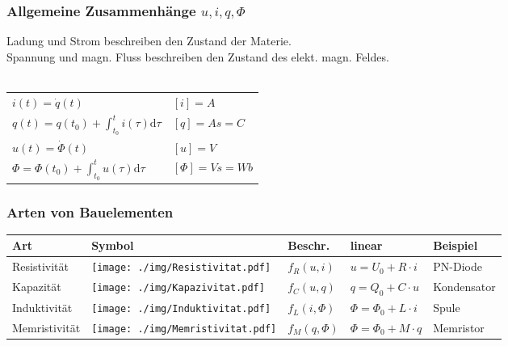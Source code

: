 \documentclass[fs, footer]{latex4ei}
\begin{document}
\begin{multicols*}{4}
		\subsubsection{Allgemeine Zusammenhänge $u,i,q,\Phi$}
		Ladung und Strom beschreiben den Zustand der Materie.\\
		Spannung und magn. Fluss beschreiben den Zustand des elekt. magn. Feldes.\\ \\
		\begin{tabular}{l|l}
			$i(t) = \dot q(t)$ & $[i]=A$\\
			$q(t) = q(t_0) + \int_{t_0}^t i(\tau) \mathrm d\tau$	& $[q]=As=C$ \\ \hline
			$u(t) = \dot \Phi(t)$ & $[u]=V$\\
			$\Phi = \Phi(t_0) + \int_{t_0}^t u(\tau) \mathrm d\tau$ & $[\Phi]=Vs=Wb$ \\
		\end{tabular}




		\subsubsection{Arten von Bauelementen}
		\begin{tabular}{l|l|l|l|l}
			Art & Symbol & Beschr. & linear & Beispiel\\ \hline
			Resistivität & \texttt{[image: ./img/Resistivitat.pdf]} & $f_R(u,i)$  & $u = U_0 + R \cdot i$ & PN-Diode\\
			Kapazität & \texttt{[image: ./img/Kapazivitat.pdf]} & $f_C(u,q)$ & $q = Q_0 + C \cdot u$ & Kondensator\\
			Induktivität & \texttt{[image: ./img/Induktivitat.pdf]} & $f_L(i,\Phi)$ & $\Phi = \Phi_0 + L \cdot i$ & Spule\\
			Memristivität & \texttt{[image: ./img/Memristivitat.pdf]} & $f_M(q,\Phi)$ & $\Phi = \Phi_0 + M \cdot q$ & Memristor\\
		\end{tabular}





\sectionbox{
}
\end{multicols*}
\end{document}
